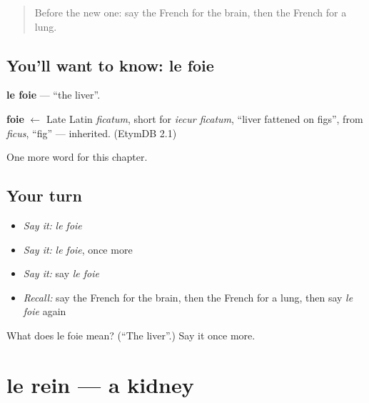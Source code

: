 \label{lesson:FR-C154-foie}



\begin{quote}
Before the new one: say the French for the brain, then the French for a lung.
\end{quote}

\subsection*{You'll want to know: le foie}
\textbf{le foie} — \textquotedblleft{}the liver\textquotedblright{}.

\begin{cousinweb}
\textbf{foie} $\leftarrow$ Late Latin \emph{ficatum}, short for \emph{iecur ficatum}, \textquotedblleft{}liver fattened on figs\textquotedblright{}, from \emph{ficus}, \textquotedblleft{}fig\textquotedblright{} — inherited. (EtymDB 2.1)
\end{cousinweb}

\begin{grammarlens}[title={What you've built}]
One more word for this chapter.
\end{grammarlens}

\subsection*{Your turn}
\begin{itemize}
\raggedright
  \item \emph{Say it:} \emph{le foie}
  \item \emph{Say it:} \emph{le foie}, once more
  \item \emph{Say it:} say \emph{le foie}
  \item \emph{Recall:} say the French for the brain, then the French for a lung, then say \emph{le foie} again
\end{itemize}

\begin{tcolorbox}[breakable,colback=teal!4,colframe=teal!35!black,title={Before you move on}]
What does le foie mean? (\textquotedblleft{}The liver\textquotedblright{}.) Say it once more.
\end{tcolorbox}
\section[le rein]{le rein — a kidney}

\label{lesson:FR-C154-rein}



